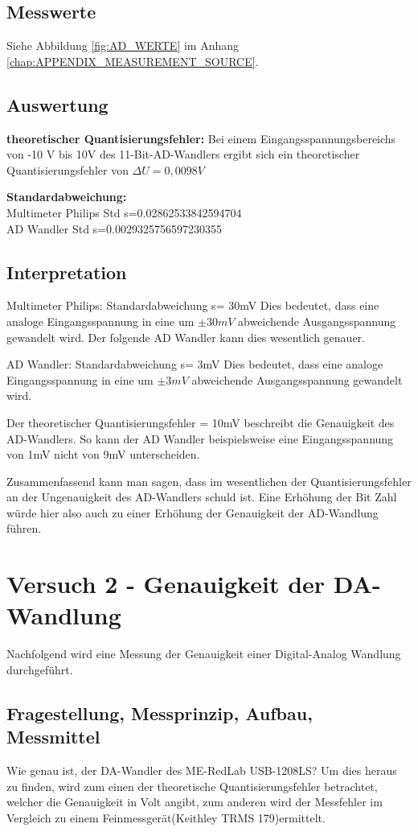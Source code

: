 \documentclass[12pt,oneside,a4paper]{report}
\begin{document}
\section{Messwerte}
\label{chap:VERSUCH_1_MESSWERTE}
Siehe Abbildung \ref{fig:AD_WERTE} im Anhang \ref{chap:APPENDIX_MEASUREMENT_SOURCE}.


\section{Auswertung}
\label{chap:VERSUCH_1_AUSWERTUNG}
\textbf{theoretischer Quantisierungsfehler:}
Bei einem Eingangsspannungsbereichs von -10 V bis 10V des 11-Bit-AD-Wandlers ergibt sich ein theoretischer Quantisierungsfehler von $\Delta U = 0,0098 V$

\textbf{Standardabweichung:}\\
Multimeter Philips Std s=0.02862533842594704\\
AD Wandler Std s=0.0029325756597230355

\section{Interpretation}
\label{chap:VERSUCH_1_INTERPRETATION}
Multimeter Philips:
Standardabweichung s= 30mV
Dies bedeutet, dass eine analoge Eingangsspannung in eine um $\pm30mV$ abweichende Ausgangsspannung gewandelt wird. Der folgende AD Wandler kann dies wesentlich genauer.

AD Wandler:
Standardabweichung s= 3mV
Dies bedeutet, dass eine analoge Eingangsspannung in eine um $\pm3mV$ abweichende Ausgangsspannung gewandelt wird.

Der theoretischer Quantisierungsfehler = 10mV beschreibt die Genauigkeit des AD-Wandlers. So kann der AD Wandler beispielsweise eine Eingangsspannung von 1mV nicht von 9mV unterscheiden.

Zusammenfassend kann man sagen, dass im wesentlichen der Quantisierungsfehler an der Ungenauigkeit des  AD-Wandlers schuld ist. Eine Erhöhung der Bit Zahl würde hier also auch zu einer Erhöhung der Genauigkeit der AD-Wandlung führen.

%
%
\chapter{Versuch 2 - Genauigkeit der DA-Wandlung}
\label{chap:VERSUCH_2}
Nachfolgend wird eine Messung der Genauigkeit einer Digital-Analog Wandlung durchgeführt.

\section{Fragestellung, Messprinzip, Aufbau, Messmittel}
\label{chap:VERSUCH_2_FRAGESTELLUNG}
Wie genau ist, der DA-Wandler des ME-RedLab USB-1208LS?
Um dies heraus zu finden, wird zum einen der theoretische Quantisierungsfehler betrachtet, welcher die Genauigkeit in Volt angibt, zum anderen wird der Messfehler im Vergleich zu einem Feinmessgerät(Keithley TRMS 179)ermittelt.
\end{document}

